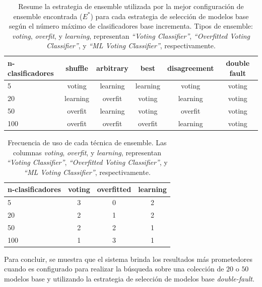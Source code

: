 \begin{table}[H]
    \centering

    \begin{tabular}{lccccc}
    \toprule
        n-clasificadores & shuffle & arbitrary & best & disagreement & double fault  \\ \midrule \midrule
        5   & voting & learning & learning & voting & voting \\
        20  & learning & overfit & voting & learning & voting \\
        50  & overfit & learning & voting & overfit & voting \\
        100 & overfit & overfit & overfit & learning & voting \\
    \bottomrule
    \end{tabular}
    
    \caption{Resume la estrategia de ensemble utilizada por la mejor configuración de ensemble encontrada ($E^*$) para cada estrategia de selección de modelos base según el número máximo de clasificadores base incrementa.
    Tipos de ensemble: \emph{voting}, \emph{overfit}, y \emph{learning}, representan \emph{``Voting Classifier''}, \emph{``Overfitted Voting Classifier''}, y \emph{``ML Voting Classifier''}, respectivamente.
    }
    \label{table:types}
\end{table}

\begin{table}[H]
    \centering
    
    \begin{tabular}{lccc}
    \toprule
        n-clasificadores & voting  & overfitted & learning \\ \midrule \midrule
        5   & 3 & 0 & 2 \\
        20  & 2 & 1 & 2 \\
        50  & 2 & 2 & 1 \\
        100 & 1 & 3 & 1 \\
    \bottomrule
    \end{tabular}

    \caption{Frecuencia de uso de cada técnica de ensemble.
    Las columnas \emph{voting}, \emph{overfit}, y \emph{learning}, representan \emph{``Voting Classifier''}, \emph{``Overfitted Voting Classifier''}, y \emph{``ML Voting Classifier''}, respectivamente.}
    \label{table:types-count}
\end{table}

Para concluir, se muestra que el sistema brinda los resultados más prometedores cuando es configurado para realizar la búsqueda sobre una colección de $20$ o $50$ modelos base y utilizando la estrategia de selección de modelos base \emph{double-fault}.

